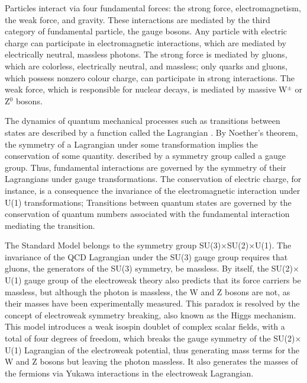 Particles interact via four fundamental forces: the strong force, electromagnetism, the weak force, and gravity. These interactions are mediated by the third category of fundamental particle, the gauge bosons. Any particle with electric charge can participate in electromagnetic interactions, which are mediated by electrically neutral, massless photons. The strong force is mediated by gluons, which are colorless, electrically neutral, and massless; only quarks and gluons, which possess nonzero colour charge, can participate in strong interactions. The weak force, which is responsible for nuclear decays, is mediated by massive W$^{\pm}$ or Z$^{0}$ bosons.

The dynamics of quantum mechanical processes such as transitions between states are described by a function called the Lagrangian . By Noether's theorem, the symmetry of a Lagrangian under some transformation implies the conservation of some quantity. described by a symmetry group called a gauge group. Thus, fundamental interactions are governed by the symmetry of their Lagrangians under gauge transformations. The conservation of electric charge, for instance, is a consequence the invariance of the electromagnetic interaction under U(1) transformations; 
Transitions between quantum states are governed by the conservation of quantum numbers associated with the fundamental interaction mediating the transition.

The Standard Model belongs to the symmetry group SU(3)$\times$SU(2)$\times$U(1). The invariance of the QCD Lagrangian under the SU(3) gauge group requires that gluons, the generators of the SU(3) symmetry, be massless. By itself, the SU(2)$\times$U(1) gauge group of the electroweak theory also predicts that its force carriers be massless, but although the photon is massless, the W and Z bosons are not, as their masses have been experimentally measured. This paradox is resolved by the concept of electroweak symmetry breaking, also known as the Higgs mechanism. This model introduces a weak isospin doublet of complex scalar fields, with a total of four degrees of freedom, which breaks the gauge symmetry of the SU(2)$\times$U(1) Lagrangian of the electroweak potential, thus generating mass terms for the W and Z bosons but leaving the photon massless. It also generates the masses of the fermions via Yukawa interactions in the electroweak Lagrangian.

